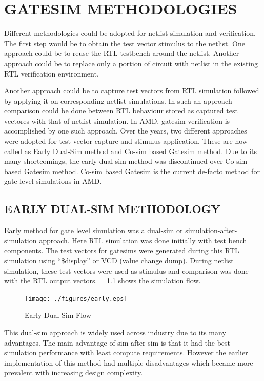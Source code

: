 \chapter{GATESIM METHODOLOGIES}
\label{chap:methodologies.tex}

Different methodologies could be adopted for netlist simulation and verification. The first step would be to obtain the test vector stimulus to the netlist. One approach could be to reuse the RTL testbench around the netlist. Another approach could be to replace only a portion of circuit with netlist in the existing RTL verification environment.

Another approach could be to capture test vectors from RTL simulation followed by applying it on corresponding netlist simulations. In such an approach comparison could be done between RTL behaviour stored as captured test vectores with that of netlist simulation.  In AMD, gatesim verification is accomplished by one such approach. Over the years, two different approaches were adopted for test vector capture and stimulus application. These are now called as Early Dual-Sim method and Co-sim based Gatesim method. Due to its many shortcomings, the early dual sim method was discontinued over Co-sim based Gatesim method. Co-sim based Gatesim is the current de-facto method for gate level simulations in AMD.


\section{EARLY DUAL-SIM METHODOLOGY}
Early method for gate level simulation was a dual-sim or simulation-after-simulation approach. Here RTL simulation was done initially with test bench components. The test vectors for gatesims were generated during this RTL simulation using ``\$display'' or VCD (value change dump). During netlist simulation, these test vectors were used as stimulus and comparison was done with the RTL output vectors. ~\figurename{~\ref{fig:early.eps}} shows the simulation flow. %

\begin{figure}[H]
\centering
\texttt{[image: ./figures/early.eps]}
\caption{Early Dual-Sim Flow}
\label{fig:early.eps}
\end{figure}

This dual-sim approach is widely used across industry due to its many advantages. The main advantage of sim after sim is that it had the best simulation performance with least compute requirements. However the earlier implementation of this method had multiple disadvantages which became more prevalent with increasing design complexity.


